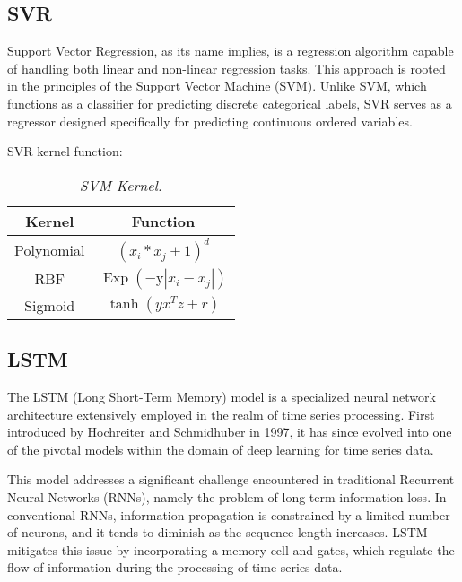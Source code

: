 \documentclass{ieeeojies}
\begin{document}
\subsection{SVR}
\hspace{0.3cm}
Support Vector Regression, as its name implies, is a regression algorithm capable of handling both linear and non-linear regression tasks. This approach is rooted in the principles of the Support Vector Machine (SVM). Unlike SVM, which functions as a classifier for predicting discrete categorical labels, SVR serves as a regressor designed specifically for predicting continuous ordered variables.

SVR kernel function:
\begin{table}[h]
    \centering
    \vspace{-0.2cm}
    \begin{tabular}{|c|c|}
    \hline \textbf{Kernel} & \textbf{Function} \\
    \hline Polynomial & $\left(x_i * x_j+1\right)^d$ \\
    \hline RBF & $\operatorname{Exp}\left(-\mathrm{y}\left|x_i-x_j\right|\right)$ \\
    \hline Sigmoid & $\tanh \left(y x^T z+r\right)$ \\ 
    \hline
    \end{tabular}
    \caption{\centering \textit{SVM Kernel.}}
    \vspace{-1cm}
\end{table}

\subsection{LSTM}
\hspace{0.3cm}The LSTM (Long Short-Term Memory) model is a specialized neural network architecture extensively employed in the realm of time series processing. First introduced by Hochreiter and Schmidhuber in 1997, it has since evolved into one of the pivotal models within the domain of deep learning for time series data.

This model addresses a significant challenge encountered in traditional Recurrent Neural Networks (RNNs), namely the problem of long-term information loss. In conventional RNNs, information propagation is constrained by a limited number of neurons, and it tends to diminish as the sequence length increases. LSTM mitigates this issue by incorporating a memory cell and gates, which regulate the flow of information during the processing of time series data.
\end{document}
